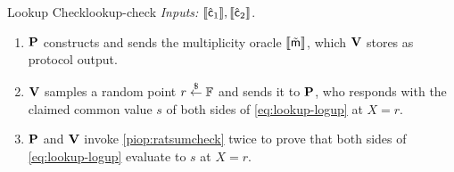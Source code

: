 \begin{DefinePIOP}{Lookup Check}{lookup-check}
  \emph{Inputs:} $\llbracket\hat{\mathsf{c}}_1\rrbracket, \llbracket\hat{\mathsf{c}}_2\rrbracket$.
  \begin{enumerate}[nosep]
    \item $\bf{P}$ constructs and sends the multiplicity oracle $\llbracket\tilde{\mathsf{m}}\rrbracket$, which $\bf{V}$ stores as protocol output.
    \item $\bf{V}$ samples a random point $r \overset{\$}{\leftarrow} \mathbb{F}$ and sends it to $\bf{P}$, who responds with the claimed common value $s$ of both sides of \cref{eq:lookup-logup} at $X = r$.
    \item $\bf{P}$ and $\bf{V}$ invoke \cref{piop:ratsumcheck} twice to prove that both sides of \cref{eq:lookup-logup} evaluate to $s$ at $X = r$.
  \end{enumerate}
\end{DefinePIOP}


